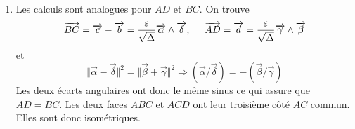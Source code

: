\begin{enumerate}
\begin{enumerate}
 \item Les calculs sont analogues pour $AD$ et $BC$. On trouve
\begin{displaymath}
 \overrightarrow{BC} = \overrightarrow c - \overrightarrow b = \frac{\varepsilon}{\sqrt{\Delta}}\overrightarrow \alpha \wedge \overrightarrow \delta
,\hspace{0.5cm}
\overrightarrow{AD}=\overrightarrow d = \frac{\varepsilon}{\sqrt{\Delta}}\overrightarrow \gamma \wedge \overrightarrow \beta
\end{displaymath}
et
\begin{displaymath}
 \Vert \overrightarrow \alpha - \overrightarrow \delta \Vert^2 = 
\Vert \overrightarrow \beta + \overrightarrow \gamma \Vert^2
\Rightarrow
 (\overrightarrow \alpha / \overrightarrow \delta) =
- (\overrightarrow \beta / \overrightarrow \gamma)
\end{displaymath}
Les deux écarts angulaires ont donc le même sinus ce qui assure que $AD = BC$. Les deux faces $ABC$ et $ACD$ ont leur troisième côté $AC$ commun. Elles sont donc isométriques.
\end{enumerate}

\end{enumerate}

